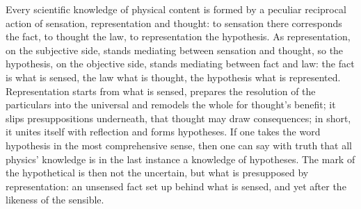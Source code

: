 \documentclass[12pt,a4paper]{book}
\begin{document}
Every scientific knowledge of physical content is formed by a peculiar reciprocal action of sensation, representation and
thought: to sensation there corresponds the fact, to thought the law, to representation the hypothesis. As
representation, on the subjective side, stands mediating between sensation and thought, so the hypothesis, on the
objective side, stands mediating between fact and law: the fact is what is sensed, the law what is thought, the
hypothesis what is represented. Representation starts from what is sensed, prepares the resolution of the particulars
into the universal and remodels the whole for thought's benefit; it slips presuppositions underneath, that thought may
draw consequences; in short, it unites itself with reflection and forms hypotheses. If one takes the word hypothesis in
the most comprehensive
sense, then one can say with truth that all physics' knowledge is in the last instance a knowledge of hypotheses. The
mark of the hypothetical is then not the uncertain, but what is presupposed by representation: an unsensed fact set up
behind what is sensed, and yet after the likeness of the sensible.
\end{document}
